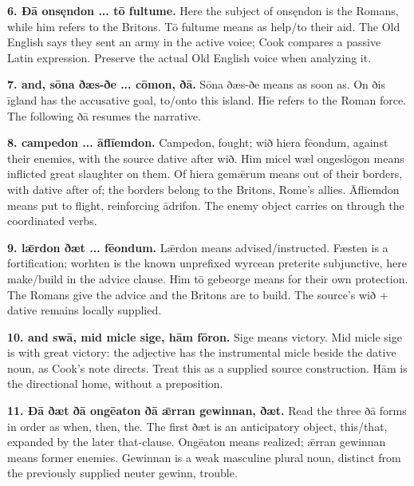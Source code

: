 \textbf{6. Ðā onsęndon ... tō fultume.} Here the subject of onsęndon is the Romans, while him refers to the Britons. Tō fultume means as help/\allowbreak{}to their aid. The Old English says they sent an army in the active voice; Cook compares a passive Latin expression. Preserve the actual Old English voice when analyzing it.

\textbf{7. and, sōna ðæs-ðe ... cōmon, ðā.} Sōna ðæs-ðe means as soon as. On ðis īgland has the accusative goal, to/\allowbreak{}onto this island. Hīe refers to the Roman force. The following ðā resumes the narrative.

\textbf{8. campedon ... āflīemdon.} Campedon, fought; wið hiera fēondum, against their enemies, with the source dative after wið. Him micel wæl ongeslōgon means inflicted great slaughter on them. Of hiera gemǣrum means out of their borders, with dative after of; the borders belong to the Britons, Rome’s allies. Āflīemdon means put to flight, reinforcing ādrifon. The enemy object carries on through the coordinated verbs.

\textbf{9. lǣrdon ðæt ... fēondum.} Lǣrdon means advised/\allowbreak{}instructed. Fæsten is a fortification; worhten is the known unprefixed wyrcean preterite subjunctive, here make/\allowbreak{}build in the advice clause. Him tō gebeorge means for their own protection. The Romans give the advice and the Britons are to build. The source’s wið + dative remains locally supplied.

\textbf{10. and swā, mid micle sige, hām fōron.} Sige means victory. Mid micle sige is with great victory: the adjective has the instrumental micle beside the dative noun, as Cook’s note directs. Treat this as a supplied source construction. Hām is the directional home, without a preposition.

\textbf{11. Ðā ðæt ðā ongēaton ðā ǣrran gewinnan, ðæt.} Read the three ðā forms in order as when, then, the. The first ðæt is an anticipatory object, this/\allowbreak{}that, expanded by the later that-clause. Ongēaton means realized; ǣrran gewinnan means former enemies. Gewinnan is a weak masculine plural noun, distinct from the previously supplied neuter gewinn, trouble.


